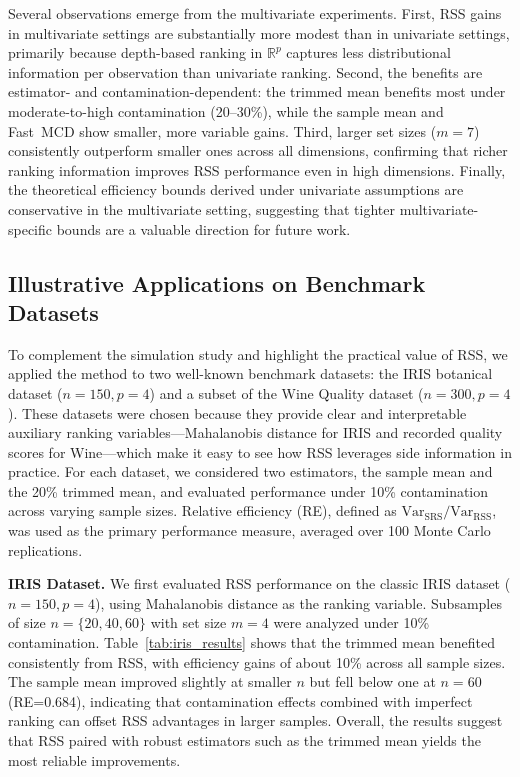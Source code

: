\documentclass[12pt]{article}
\makeatletter
\let\oldparagraph\paragraph
\renewcommand{\paragraph}{
    \@ifstarcorollary
      \xxxParagraphStar
      \xxxParagraphNoStar
  }
\newcommand{\xxxParagraphStar}[1]{\oldparagraph*{#1}\mbox{}}
\newcommand{\xxxParagraphNoStar}[1]{\oldparagraph{#1}\mbox{}}
\makeatother
\begin{document}
Several observations emerge from the multivariate experiments. First, RSS gains in multivariate settings are substantially more modest than in univariate settings, primarily because depth-based ranking in $\mathbb{R}^p$ captures less distributional information per observation than univariate ranking. Second, the benefits are estimator- and contamination-dependent: the trimmed mean benefits most under moderate-to-high contamination (20--30\%), while the sample mean and Fast~MCD show smaller, more variable gains. Third, larger set sizes ($m = 7$) consistently outperform smaller ones across all dimensions, confirming that richer ranking information improves RSS performance even in high dimensions. Finally, the theoretical efficiency bounds derived under univariate assumptions are conservative in the multivariate setting, suggesting that tighter multivariate-specific bounds are a valuable direction for future work.



\subsection{Illustrative Applications on Benchmark Datasets}\label{sec:realdata}
To complement the simulation study and highlight the practical value of RSS, we applied the method to two well-known benchmark datasets: the IRIS botanical dataset ($n=150, p=4$) and a subset of the Wine Quality dataset ($n=300, p=4$).
These datasets were chosen because they provide clear and interpretable auxiliary ranking variables—Mahalanobis distance for IRIS and recorded quality scores for Wine—which make it easy to see how RSS leverages side information in practice.
For each dataset, we considered two estimators, the sample mean and the 20\% trimmed mean, and evaluated performance under 10\% contamination across varying sample sizes.
Relative efficiency (RE), defined as $\text{Var}_{\text{SRS}}/\text{Var}_{\text{RSS}}$, was used as the primary performance measure, averaged over 100 Monte Carlo replications.

{\bf IRIS Dataset.}
We first evaluated RSS performance on the classic IRIS dataset ($n=150, p=4$), using Mahalanobis distance as the ranking variable.
Subsamples of size $n=\{20,40,60\}$ with set size $m=4$ were analyzed under 10\% contamination.
Table~\ref{tab:iris_results} shows that the trimmed mean benefited consistently from RSS, with efficiency gains of about 10\% across all sample sizes.
The sample mean improved slightly at smaller $n$ but fell below one at $n=60$ (RE=0.684), indicating that contamination effects combined with imperfect ranking can offset RSS advantages in larger samples.
Overall, the results suggest that RSS paired with robust estimators such as the trimmed mean yields the most reliable improvements.
\end{document}
